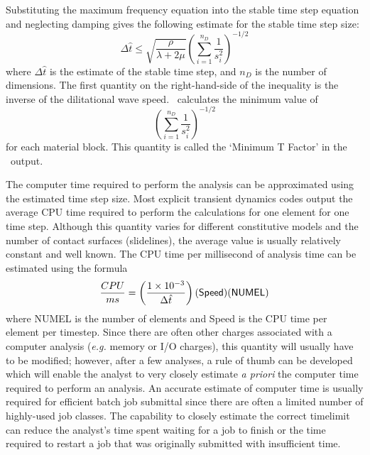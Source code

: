 Substituting the maximum frequency equation into the stable time step
equation and neglecting damping gives the following estimate for the
stable time step size: 
\begin{equation}
\Delta\hat t\le \sqrt{\frac{\rho}{\lambda+2\mu}}
      \left(\sum_{i=1}^{n_D}\frac{1}{s_i^2}\right)^{-1/2}
\end{equation}
where $\Delta\hat t$ is the estimate of the stable time step, and
$n_D$ is the number of dimensions.  The first quantity on the
right-hand-side of the inequality is the inverse of the dilitational
wave speed.  \NUM\ calculates the minimum value of 
\begin{equation}
      \left(\sum_{i=1}^{n_D}\frac{1}{s_i^2}\right)^{-1/2}
\end{equation}
for each material block.  This quantity is called the `Minimum T
Factor' in the \NUM\ output.  

The computer time required to perform the analysis can be approximated
using the estimated time step size.  Most explicit transient dynamics
codes output the average CPU time required to perform the calculations
for one element for one time step. Although this quantity varies for
different constitutive models and the number of contact surfaces
(slidelines), the average value is usually relatively constant and
well known.  The CPU time per millisecond of analysis time can be
estimated using the formula 
\begin{equation}
{CPU\over ms} = \left(1\times10^{-3} \over \Delta\hat t\right) 
                ({\sf Speed})({\sf NUMEL})
\end{equation}
where {\sf NUMEL} is the number of elements and {\sf Speed} is the CPU
time per element per timestep.  Since there are often other charges
associated with a computer analysis ({\it e.g.} memory or I/O
charges), this quantity will usually have to be modified; however,
after a few analyses, a rule of thumb can be developed which will
enable the analyst to very closely estimate {\it a priori} the
computer time required to perform an analysis.  An accurate estimate
of computer time is usually required for efficient batch job submittal
since there are often a limited number of highly-used job classes.
The capability to closely estimate the correct timelimit can reduce
the analyst's time spent waiting for a job to finish or the time
required to restart a job that was originally submitted with
insufficient time. 

